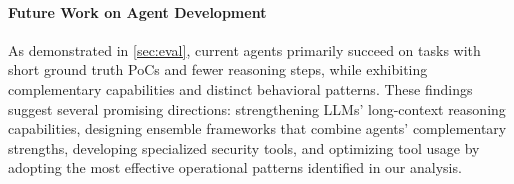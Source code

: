 \paragraph{Future Work on Agent Development}

As demonstrated in \cref{sec:eval}, current agents primarily succeed on tasks with short ground truth PoCs and fewer reasoning steps, while exhibiting complementary capabilities and distinct behavioral patterns.
These findings suggest several promising directions: strengthening LLMs' long-context reasoning capabilities, designing ensemble frameworks that combine agents' complementary strengths, developing specialized security tools, and optimizing tool usage by adopting the most effective operational patterns identified in our analysis.
